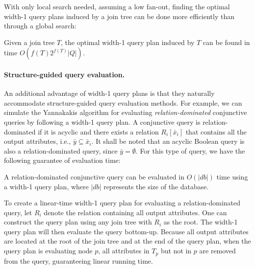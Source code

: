 With only local search needed, assuming a low fan-out, finding the optimal width-1 query plans induced by a join tree can be done more efficiently than through a global search:

\begin{theorem} \label{thm:opt-hierarchical-time}
    Given a join tree $T$, the optimal width-1 query plan induced by $T$ can be found in time $O(f(T)2^{f(T)} |Q|)$.
\end{theorem}

\paragraph{Structure-guided query evaluation.} An additional advantage of width-1 query plans is that they naturally accommodate structure-guided query evaluation methods. For example, we can simulate the Yannakakis algorithm for evaluating \emph{relation-dominated} conjunctive queries \cite{wang_yannakakis_2025} by following a width-1 query plan. A conjunctive query is relation-dominated if it is acyclic and there exists a relation $R_i[\bar{x}_i]$ that contains all the output attributes, i.e., $\bar{y} \subseteq \bar{x}_i$.  It shall be noted that an acyclic Boolean query is also a relation-dominated query, since $\bar{y} = \emptyset$.
For this type of query, we have the following guarantee of evaluation time:

\begin{theorem}
    \label{thm:rel-dom}
    A relation-dominated conjunctive query can be evaluated in $O(|db|)$ time using a width-1 query plan, where $|db|$ represents the size of the database.
\end{theorem}

To create a linear-time width-1 query plan for evaluating a relation-dominated query, let $R_i$ denote the relation containing all output attributes. One can construct the query plan using any join tree with $R_i$ as the root. The width-1 query plan will then evaluate the query bottom-up. Because all output attributes are located at the root of the join tree and at the end of the query plan, when the query plan is evaluating node $p$, all attributes in $T_p$ but not in $p$ are removed from the query, guaranteeing linear running time.  

